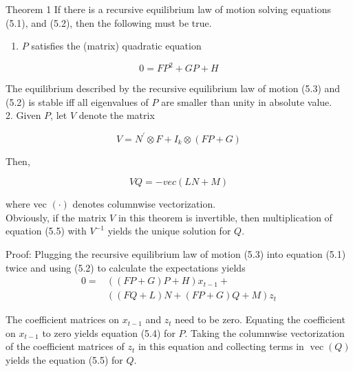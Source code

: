 \documentclass[10pt]{article}
\begin{document}
Theorem 1 If there is a recursive equilibrium law of motion solving equations (5.1), and (5.2), then the following must be true.

\begin{enumerate}
  \item $P$ satisfies the (matrix) quadratic equation
\end{enumerate}

\begin{equation*}
0=F P^{2}+G P+H \tag{5.4}
\end{equation*}

The equilibrium described by the recursive equilibrium law of motion (5.3) and (5.2) is stable iff all eigenvalues of $P$ are smaller than unity in absolute value.\\
2. Given $P$, let $V$ denote the matrix

\begin{equation*}
V=N^{\prime} \otimes F+I_{k} \otimes(F P+G)
\end{equation*}

Then,

\begin{equation*}
V Q=-v e c(L N+M) \tag{5.5}
\end{equation*}

where vec $(\cdot)$ denotes columnwise vectorization.\\
Obviously, if the matrix $V$ in this theorem is invertible, then multiplication of equation (5.5) with $V^{-1}$ yields the unique solution for $Q$.

Proof: Plugging the recursive equilibrium law of motion (5.3) into equation (5.1) twice and using (5.2) to calculate the expectations yields\\
\begin{align*}
0= & ((F P+G) P+H) x_{t-1}+  \tag{5.6}\\
& ((F Q+L) N+(F P+G) Q+M) z_{t}
\end{align*}

The coefficient matrices on $x_{t-1}$ and $z_{t}$ need to be zero. Equating the coefficient on $x_{t-1}$ to zero yields equation (5.4) for $P$. Taking the columnwise vectorization of the coefficient matrices of $z_{t}$ in this equation and collecting terms in $\operatorname{vec}(Q)$ yields the equation (5.5) for $Q$.
\end{document}
